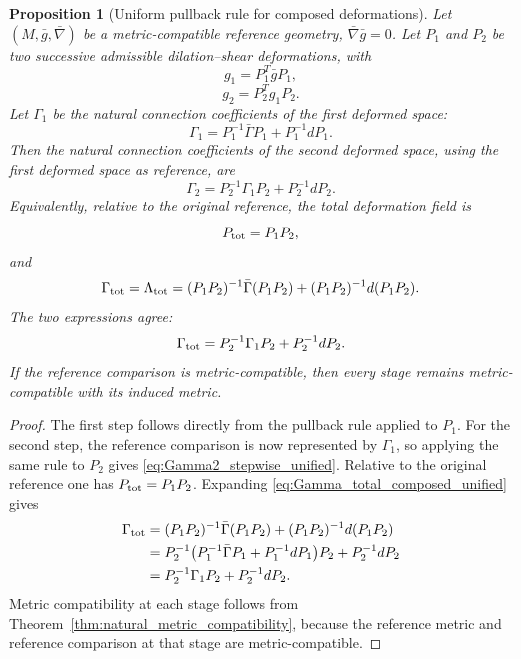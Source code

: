 \documentclass[12pt]{amsart}
\newtheorem{proposition}[theorem]{Proposition}
\theoremstyle{definition}
\theoremstyle{remark}
\begin{document}
\begin{proposition}[Uniform pullback rule for composed deformations]\label{prop:unified_composition_rule}
Let \((M,\bar g,\bar\nabla)\) be a metric-compatible reference geometry, \(\bar\nabla\bar g=0\).  Let \(P_1\) and \(P_2\) be two successive admissible dilation--shear deformations, with
\begin{equation}\label{eq:g1_composed_unified}
 g_1=P_1^T\bar gP_1,
\end{equation}
\begin{equation}\label{eq:g2_composed_unified}
 g_2=P_2^Tg_1P_2.
\end{equation}
Let \(\Gamma_1\) be the natural connection coefficients of the first deformed space:
\begin{equation}\label{eq:Gamma1_composed_unified}
 \Gamma_1=P_1^{-1}\bar\Gamma P_1+P_1^{-1}dP_1.
\end{equation}
Then the natural connection coefficients of the second deformed space, using the first deformed space as reference, are
\begin{equation}\label{eq:Gamma2_stepwise_unified}
 \Gamma_2=P_2^{-1}\Gamma_1P_2+P_2^{-1}dP_2.
\end{equation}
Equivalently, relative to the original reference, the total deformation field is
\begin{equation}\label{eq:Ptot_composed_v2}
 P_{\rm tot}=P_1P_2,
\end{equation}
and
\begin{equation}\label{eq:Gamma_total_composed_unified}
 \Gamma_{\rm tot}=\Lambda_{\rm tot}
 =(P_1P_2)^{-1}\bar\Gamma(P_1P_2)+(P_1P_2)^{-1}d(P_1P_2).
\end{equation}
The two expressions agree:
\begin{equation}\label{eq:Gamma_total_expanded_unified}
 \Gamma_{\rm tot}=P_2^{-1}\Gamma_1P_2+P_2^{-1}dP_2.
\end{equation}
If the reference comparison is metric-compatible, then every stage remains metric-compatible with its induced metric.
\end{proposition}

\begin{proof}
The first step follows directly from the pullback rule applied to \(P_1\).  For the second step, the reference comparison is now represented by \(\Gamma_1\), so applying the same rule to \(P_2\) gives \eqref{eq:Gamma2_stepwise_unified}.  Relative to the original reference one has \(P_{\rm tot}=P_1P_2\).  Expanding \eqref{eq:Gamma_total_composed_unified} gives
\begin{align*}
\Gamma_{\rm tot}
&=(P_1P_2)^{-1}\bar\Gamma(P_1P_2)+(P_1P_2)^{-1}d(P_1P_2)\\
&=P_2^{-1}\bigl(P_1^{-1}\bar\Gamma P_1+P_1^{-1}dP_1\bigr)P_2+P_2^{-1}dP_2\\
&=P_2^{-1}\Gamma_1P_2+P_2^{-1}dP_2.
\end{align*}
Metric compatibility at each stage follows from Theorem~\ref{thm:natural_metric_compatibility}, because the reference metric and reference comparison at that stage are metric-compatible.
\end{proof}
\end{document}
